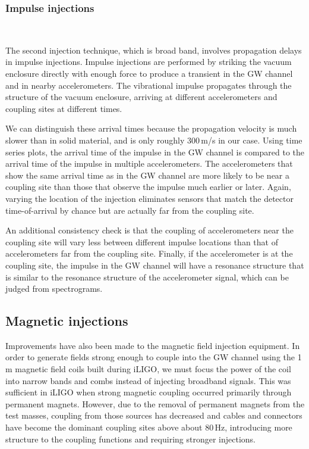 \subsubsection{Impulse injections}~\label{sec:injections-vib-impulse}

The second injection technique, which is broad band, involves propagation delays in impulse injections.
Impulse injections are performed by striking the vacuum enclosure directly with enough force to produce a transient in the \ac{GW} channel and in nearby accelerometers.
The vibrational impulse propagates through the structure of the vacuum enclosure, arriving at different accelerometers and coupling sites at different times.

We can distinguish these arrival times because the propagation velocity is much slower than in solid material, and is only roughly 300\,m/s in our case. Using time series plots, the arrival time of the impulse in the \ac{GW} channel is compared to the arrival time of the impulse in multiple accelerometers.
The accelerometers that show the same arrival time as in the \ac{GW} channel are more likely to be near a coupling site than those that observe the impulse much earlier or later.
Again, varying the location of the injection eliminates sensors that match the detector time-of-arrival by chance but are actually far from the coupling site.

An additional consistency check is that the coupling of accelerometers near the coupling site will vary less between different impulse locations than that of accelerometers far from the coupling site.
Finally, if the accelerometer is at the coupling site, the impulse in the \ac{GW} channel will have a resonance structure that is similar to the resonance structure of the accelerometer signal, which can be judged from spectrograms.


\subsection{Magnetic injections}\label{sec:injections-magnetic}

Improvements have also been made to the magnetic field injection equipment. In order to generate fields strong enough to couple into the \ac{GW} channel using the 1\,m magnetic field coils built during \ac{iLIGO}, we must focus the power of the coil into narrow bands and combs instead of injecting broadband signals. This was sufficient in \ac{iLIGO} when strong magnetic coupling occurred primarily through permanent magnets. However, due to the removal of permanent magnets from the test masses, coupling from those sources has decreased and cables and connectors have become the dominant coupling sites above about 80\,Hz, introducing more structure to the coupling functions and requiring stronger injections.

